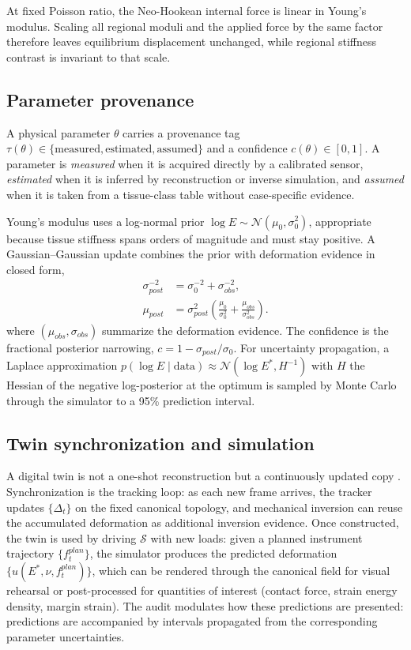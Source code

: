 \documentclass[smallextended]{svjour3}
\begin{document}
At fixed Poisson ratio, the Neo-Hookean internal force is linear in Young's modulus. Scaling all regional moduli and the applied force by the same factor therefore leaves equilibrium displacement unchanged, while regional stiffness contrast is invariant to that scale.


\subsection{Parameter provenance}
\label{sec:uq}
\begin{definition}
\label{def:provenance}
A physical parameter $\theta$ carries a provenance tag
$\tau(\theta) \in \{\text{measured}, \text{estimated}, \text{assumed}\}$ and
a confidence $c(\theta) \in [0,1]$. A parameter is \emph{measured} when it
is acquired directly by a calibrated sensor, \emph{estimated} when it is
inferred by reconstruction or inverse simulation, and \emph{assumed} when
it is taken from a tissue-class table without case-specific evidence.
\end{definition}

Young's modulus uses a log-normal prior
$\log E \sim \mathcal{N}(\mu_0, \sigma_0^2)$, appropriate because tissue
stiffness spans orders of magnitude and must stay positive. A
Gaussian--Gaussian update combines the prior with deformation evidence in
closed form,
\begin{align}
\sigma_{post}^{-2} &= \sigma_0^{-2} + \sigma_{obs}^{-2}, \nonumber\\
\mu_{post} &= \sigma_{post}^{2}\left(
\frac{\mu_0}{\sigma_0^{2}} + \frac{\mu_{obs}}{\sigma_{obs}^{2}}
\right).
\label{eq:bayes}
\end{align}
where $(\mu_{obs}, \sigma_{obs})$ summarize the deformation evidence. The
confidence is the fractional posterior narrowing,
$c = 1 - \sigma_{post}/\sigma_0$. For uncertainty propagation, a Laplace
approximation $p(\log E \mid \text{data}) \approx \mathcal{N}(\log E^*, H^{-1})$
with $H$ the Hessian of the negative log-posterior at the optimum is
sampled by Monte Carlo through the simulator to a 95\% prediction interval.

\subsection{Twin synchronization and simulation}
\label{sec:sync}
A digital twin is not a one-shot reconstruction but a continuously updated
copy \cite{landig2025}. Synchronization is the tracking loop: as each new
frame arrives, the tracker updates $\{\Delta_t\}$ on the fixed canonical
topology, and mechanical inversion can reuse the accumulated deformation as
additional inversion evidence.
Once constructed, the twin is used by driving $\mathcal{S}$ with new loads:
given a planned instrument trajectory $\{f_t^{plan}\}$, the simulator
produces the predicted deformation $\{u(E^*, \nu, f_t^{plan})\}$, which can
be rendered through the canonical field for visual rehearsal or post-processed
for quantities of interest (contact force, strain energy density, margin
strain). The audit modulates how these predictions are presented:
predictions are accompanied by intervals propagated from the corresponding
parameter uncertainties.
\end{document}
